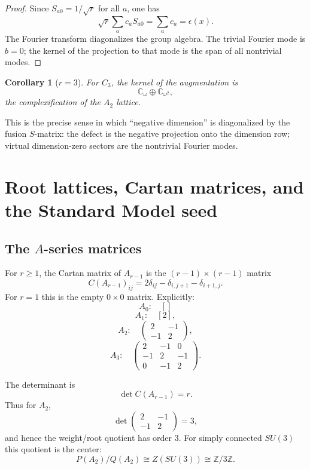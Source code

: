 \documentclass[11pt]{article}
\newtheorem{corollary}[theorem]{Corollary}
\newcommand{\ZZ}{\mathbb Z}
\newcommand{\CC}{\mathbb C}
\begin{document}
\begin{proof}
Since $S_{a0}=1/\sqrt r$ for all $a$, one has
\[
        \sqrt r\sum_a c_aS_{a0}=\sum_a c_a=\epsilon(x).
\]
The Fourier transform diagonalizes the group algebra.  The trivial Fourier mode is $b=0$; the kernel of the projection to that mode is the span of all nontrivial modes.
\end{proof}

\begin{corollary}[$r=3$]
For $C_3$, the kernel of the augmentation is
\[
        \CC_\omega\oplus \CC_{\omega^2},
\]
the complexification of the $A_2$ lattice.
\end{corollary}

This is the precise sense in which ``negative dimension'' is diagonalized by the fusion $S$-matrix: the defect is the negative projection onto the dimension row; virtual dimension-zero sectors are the nontrivial Fourier modes.

\section{Root lattices, Cartan matrices, and the Standard Model seed}

\subsection{The $A$-series matrices}

For $r\ge1$, the Cartan matrix of $A_{r-1}$ is the $(r-1)\times(r-1)$ matrix
\[
        C(A_{r-1})_{ij}=2\delta_{ij}-\delta_{i,j+1}-\delta_{i+1,j}.
\]
For $r=1$ this is the empty $0\times0$ matrix.  Explicitly:
\[
        A_0: \quad []
\]
\[
        A_1:\quad [2],
\]
\[
        A_2:\quad
        \begin{pmatrix}
        2&-1\\
        -1&2
        \end{pmatrix},
\]
\[
        A_3:\quad
        \begin{pmatrix}
        2&-1&0\\
        -1&2&-1\\
        0&-1&2
        \end{pmatrix}.
\]

The determinant is
\[
        \det C(A_{r-1})=r.
\]
Thus for $A_2$,
\[
        \det\begin{pmatrix}2&-1\\-1&2\end{pmatrix}=3,
\]
and hence the weight/root quotient has order $3$.  For simply connected $SU(3)$ this quotient is the center:
\[
        P(A_2)/Q(A_2)\cong Z(SU(3))\cong\ZZ/3\ZZ.
\]
\end{document}

